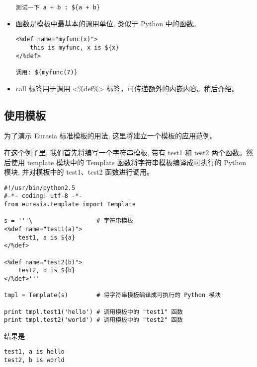 \documentclass{manual}
\begin{document}
\begin{itemize}
\begin{verbatim}
测试一下 a + b : ${a + b}
\end{verbatim}


\item {}

函数是模板中最基本的调用单位, 类似于 Python 中的函数。

\begin{verbatim}
<%def name="myfunc(x)">
    this is myfunc, x is ${x}
</%def>

调用: ${myfunc(7)}
\end{verbatim}

\item {}

call 标签用于调用 <\%def\%> 标签，可传递额外的内嵌内容。稍后介绍。

\end{itemize}

\subsection{使用模板}

为了演示 Eurasia 标准模板的用法, 这里将建立一个模板的应用范例。

在这个例子里, 我们首先将编写一个字符串模板, 带有 test1 和 test2 两个函数。然后使用 template 模块中的 Template 函数将字符串模板编译成可执行的 Python 模块, 并对模板中的 test1、test2 函数进行调用。

\begin{verbatim}
#!/usr/bin/python2.5
#-*- coding: utf-8 -*-
from eurasia.template import Template

s = '''\                  # 字符串模板
<%def name="test1(a)">
	test1, a is ${a}
</%def>

<%def name="test2(b)">
	test2, b is ${b}
</%def>'''

tmpl = Template(s)        # 将字符串模板编译成可执行的 Python 模块

print tmpl.test1('hello') # 调用模板中的 "test1" 函数
print tmpl.test2('world') # 调用模板中的 "test2" 函数
\end{verbatim}

结果是

\begin{verbatim}
test1, a is hello
test2, b is world
\end{verbatim}
\end{document}
